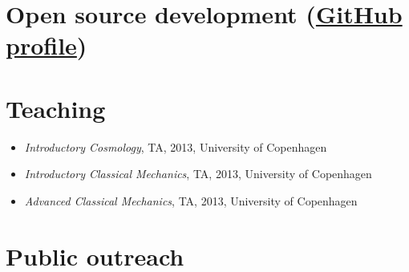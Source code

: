 \documentclass[12pt,letterpaper]{article}
\begin{document}
\section*{Open source development (\href{https://github.com/jselsing}{GitHub profile})}


\section*{Teaching}

\begin{itemize}
	
	\item \emph{Introductory Cosmology}, TA, 2013, University of Copenhagen
    \item \emph{Introductory Classical Mechanics}, TA, 2013, University of Copenhagen
	\item \emph{Advanced Classical Mechanics}, TA, 2013, University of Copenhagen
\end{itemize}


\section*{Public outreach}
\end{document}
